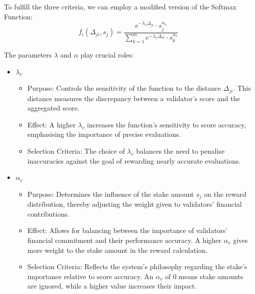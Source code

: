 \documentclass[conference]{IEEEtran}
\begin{document}
To fulfill the three criteria, we can employ a modified version of the Softmax Function:
    $$f_i(\Delta_{ji}, s_j) = \frac{e^{-\lambda_v \Delta_{ji}} \cdot s_j^{\alpha_v}}{\sum_{k=1}^{m} e^{-\lambda_v \Delta_{ki}} \cdot s_k^{\alpha_v}}$$











The parameters $\lambda$ and $\alpha$ play  crucial roles:





\begin{itemize}
    \item {$\lambda_v$}

\begin{itemize}
    \item Purpose: Controls the sensitivity of the function to the distance $\Delta_{ji}$. This distance measures the discrepancy between a validator's score and the aggregated score.
    \item Effect: A higher $\lambda_v$ increases the function's sensitivity to score accuracy, emphasising the importance of precise evaluations.
    
    \item Selection Criteria: The choice of $\lambda_v$ balances the need to penalise inaccuracies against the goal of rewarding nearly accurate evaluations.
\end{itemize}

\item {$\alpha_v$}
\begin{itemize}
    \item Purpose: Determines the influence of the stake amount $s_j$ on the reward distribution, thereby adjusting the weight given to validators' financial contributions.
    
    \item Effect:  Allows for balancing between the importance of validators' financial commitment and their performance accuracy. A higher $\alpha_v$ gives more weight to the stake amount in the reward calculation.
    
    \item Selection Criteria: Reflects the system's philosophy regarding the stake's importance relative to score accuracy. An $\alpha_v$ of 0 means stake amounts are ignored, while a higher value increases their impact.
\end{itemize}
\end{itemize}
\end{document}
